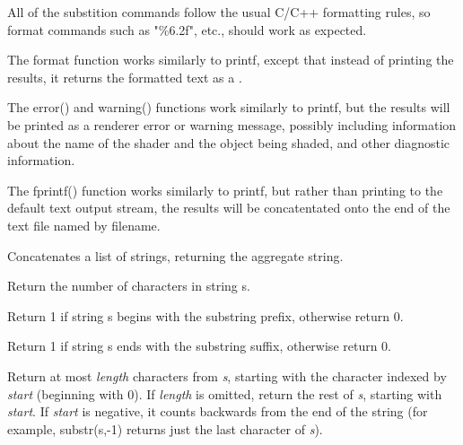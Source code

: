 \documentclass[11pt,letterpaper]{book}
\begin{document}
All of the substition commands follow the usual C/C++ formatting rules,
so format commands such as {\cf "\%6.2f"}, etc., should work as
expected.
\apiend

The {\cf format} function works similarly to {\cf printf}, except that
instead of printing the results, it returns the formatted text as a
\string.
\apiend

 
The {\cf error()} and {\cf warning()} functions work similarly to {\cf printf}, but the
results will be printed as a renderer error or warning message, possibly including
information about the name of the shader and the object being shaded,
and other diagnostic information.
\apiend

The {\cf fprintf()} function works similarly to {\cf printf}, but rather
than printing to the default text output stream, the results will be
concatentated onto the end of the text file named by {\cf filename}.
\apiend

Concatenates a list of strings, returning the aggregate string.
\apiend

Return the number of characters in string {\ce s}.
\apiend

Return 1 if string {\cf s} begins with the substring {\cf prefix},
otherwise return 0.
\apiend

Return 1 if string {\cf s} ends with the substring {\cf suffix},
otherwise return 0.
\apiend

Return at most \emph{length} characters from \emph{s}, starting with the
character indexed by \emph{start} (beginning with 0).  If \emph{length}
is omitted, return the rest of \emph{s}, starting with \emph{start}.  If
\emph{start} is negative, it counts backwards from the end of the string
(for example, {\cf substr(s,-1)} returns just the last character of
\emph{s}).
\apiend
\end{document}
